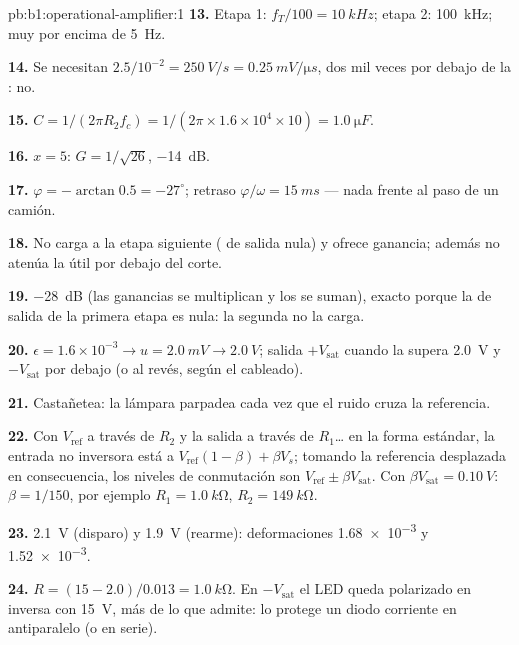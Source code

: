 \begin{solution}{pb:b1:operational-amplifier:1}
\textbf{13.} Etapa 1: $f_T/100 = \qty{10}{kHz}$; etapa 2: \qty{100}{kHz};
muy por encima de \qty{5}{Hz}.

\textbf{14.} Se necesitan $2.5/10^{-2} = \qty{250}{V/s} = \qty{0.25}{mV/\micro s}$,
dos mil veces por debajo de la : no.

\textbf{15.} $C = 1/(2\pi R_2f_c) = 1/(2\pi \times 1.6\times10^4 \times 10)
= \qty{1.0}{\micro F}$.

\textbf{16.} $x = 5$: $G = 1/\sqrt{26}$, \qty{-14}{dB}.

\textbf{17.} $\varphi = -\arctan 0.5 = -27^\circ$; retraso $\varphi/\omega =
\qty{15}{ms}$ --- nada frente al paso de un camión.

\textbf{18.} No carga a la etapa siguiente ( de salida nula) y
ofrece ganancia; además no atenúa la  útil por debajo del corte.

\textbf{19.} \qty{-28}{dB} (las ganancias se multiplican y los 
se suman), exacto porque la  de salida de la primera etapa es
nula: la segunda no la carga.

\textbf{20.} $\epsilon = 1.6\times10^{-3} \to u = \qty{2.0}{mV} \to
\qty{2.0}{V}$; salida $+V_{\mathrm{sat}}$ cuando la  supera
\qty{2.0}{V} y $-V_{\mathrm{sat}}$ por debajo (o al revés, según el cableado).

\textbf{21.} Castañetea: la lámpara parpadea cada vez que el ruido cruza
la referencia.

\textbf{22.} Con $V_{\mathrm{ref}}$ a través de $R_2$ y la salida a través
de $R_1$\dots{} en la forma estándar, la entrada no inversora está a
$V_{\mathrm{ref}}(1 - \beta) + \beta V_s$; tomando la referencia
desplazada en consecuencia, los niveles de conmutación son $V_{\mathrm{ref}} \pm \beta V_{\mathrm{sat}}$.
Con $\beta V_{\mathrm{sat}} = \qty{0.10}{V}$: $\beta = 1/150$, por ejemplo $R_1 =
\qty{1.0}{k\ohm}$, $R_2 = \qty{149}{k\ohm}$.

\textbf{23.} \qty{2.1}{V} (disparo) y \qty{1.9}{V} (rearme): deformaciones
\num{1.68e-3} y \num{1.52e-3}.

\textbf{24.} $R = (15 - 2.0)/0.013 = \qty{1.0}{k\ohm}$. En
$-V_{\mathrm{sat}}$ el LED queda polarizado en inversa con \qty{15}{V},
más de lo que admite: lo protege un diodo corriente en antiparalelo (o en serie).


\end{solution}
